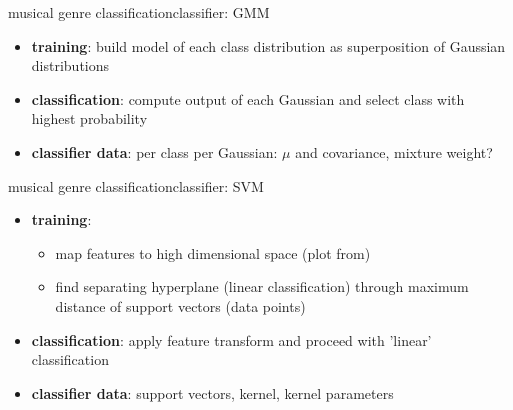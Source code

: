         \begin{frame}{musical genre classification}{classifier: GMM}
            \begin{itemize}
                \item	\textbf{training}: build model of each class distribution as superposition of Gaussian distributions
                \item<2->	\textbf{classification}: compute output of each Gaussian and select class with highest probability
                \item<3->	\textbf{classifier data}: per class per Gaussian: $\mu$ and covariance, mixture weight?
            \end{itemize}
        \end{frame}
        \begin{frame}{musical genre classification}{classifier: SVM}
            \begin{itemize}
                \item	\textbf{training}:
                    \begin{itemize}
                        \item   map features to high dimensional space (plot from)
                        \item   find separating hyperplane (linear classification) through maximum distance of support vectors (data points)
                    \end{itemize}
                \item<2->	\textbf{classification}: apply feature transform and proceed with 'linear' classification
                \item<3->	\textbf{classifier data}: support vectors, kernel, kernel parameters
            \end{itemize}
        \end{frame}

